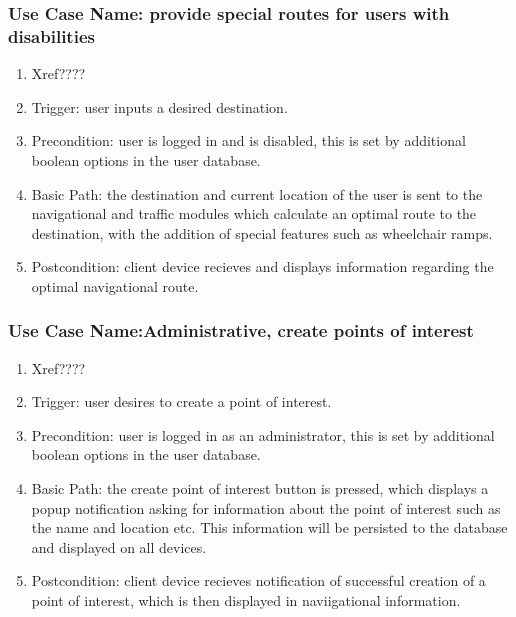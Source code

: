 \documentclass[11pt,a4paper]{article}
\begin{document}
			\subsubsection{Use Case Name: provide special routes for users with disabilities}
				\begin{enumerate}
				\renewcommand{\labelenumi}{{\textbf{\arabic{enumi}.}}}
				\item Xref????  %
				\item Trigger: user inputs a desired destination.
				\item Precondition: user is logged in and is disabled, this is set by additional boolean options in the user database.
				\item Basic Path: the destination and current location of the user is sent to the navigational and traffic modules which calculate an optimal route to the destination, with the addition of special features such as wheelchair ramps.
				\item Postcondition: client device recieves and displays information regarding the optimal navigational route.
				\end{enumerate}
				
			\subsubsection{Use Case Name:Administrative, create points of interest}
				\begin{enumerate}
				\renewcommand{\labelenumi}{{\textbf{\arabic{enumi}.}}}
				\item Xref????  %
				\item Trigger: user desires to create a point of interest.
				\item Precondition: user is logged in as an administrator, this is set by additional boolean options in the user database.
				\item Basic Path: the create point of interest button is pressed, which displays a popup notification asking for information about the point of interest such as the name and location etc. This information will be persisted to the database and displayed on all devices.
				\item Postcondition: client device recieves notification of successful creation of a point of interest, which is then displayed in naviigational information.
				\end{enumerate}
				
\end{document}
